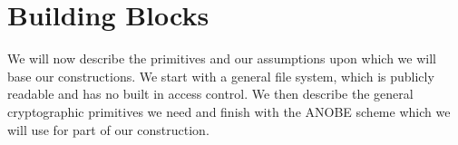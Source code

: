 \section{Building Blocks}
\label{BuildingBlocks}

We will now describe the primitives and our assumptions upon which we will base
our constructions.
We start with a general file system, which is publicly readable and has no 
built in access control.
We then describe the general cryptographic primitives we need and finish with 
the \ac{ANOBE} scheme which we will use for part of our construction.




